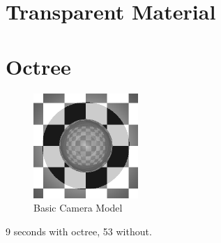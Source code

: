 \documentclass{article}
\begin{document}
\section{Transparent Material}

\section{Octree}

\begin{figure}[H]
  \begin{center}
  \includegraphics[width=150px]{Images/octreeTest.png}
  \caption{Basic Camera Model}
  \label{fig:basiccammod}
  \end{center}
\end{figure}

9 seconds with octree, 53 without.



\end{document}
